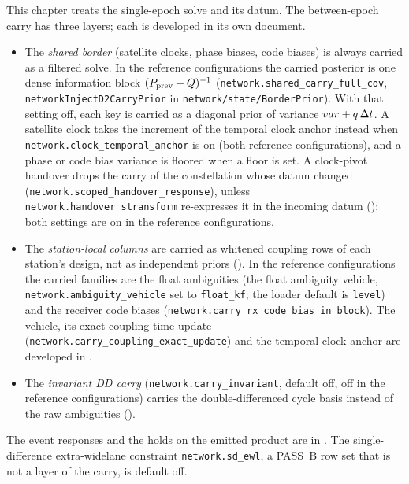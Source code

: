 \documentclass[main.tex]{subfiles}
\begin{document}
This chapter treats the single-epoch solve and its datum. The
between-epoch carry has three layers; each is developed in its own
document.
\begin{itemize}[leftmargin=*, itemsep=1pt]
\item The \emph{shared border} (satellite clocks, phase biases, code
      biases) is always carried as a filtered solve. In the reference
      configurations the carried posterior is one dense information block
      $(P_{\text{prev}} + Q)^{-1}$
      (\texttt{network.shared\_carry\_full\_cov},
      \texttt{networkInjectD2CarryPrior} in
      \texttt{network/state/BorderPrior}). With that setting off, each key
      is carried as a diagonal prior of variance $var + q\,\Delta t$.
      A satellite clock takes the increment of the temporal clock anchor
      instead when \texttt{network.clock\_temporal\_anchor} is on (both
      reference configurations), and a phase or code bias variance is
      floored when a floor is set. A clock-pivot handover drops the
      carry of the constellation whose datum changed
      (\texttt{network.scoped\_handover\_response}), unless
      \texttt{network.handover\_stransform} re-expresses it in the
      incoming datum (); both settings are on in the
      reference configurations.
\item The \emph{station-local columns} are carried as whitened coupling
      rows of each station's design, not as independent priors
      (). In the
      reference configurations the carried families are the float
      ambiguities (the float ambiguity vehicle,
      \texttt{network.ambiguity\_vehicle} set to \texttt{float\_kf};
      the loader default is \texttt{level}) and the receiver code biases
      (\texttt{network.carry\_rx\_code\_bias\_in\_block}). The vehicle,
      its exact coupling time update
      (\texttt{network.carry\_coupling\_exact\_update}) and the temporal
      clock anchor are developed in
      .
\item The \emph{invariant DD carry} (\texttt{network.carry\_invariant},
      default off, off in the reference configurations) carries the
      double-differenced cycle basis instead of the raw ambiguities
      ().
\end{itemize}
The event responses and the holds on the emitted product are in
.
The single-difference extra-widelane constraint
\texttt{network.sd\_ewl}, a PASS~B row set that is not a layer of the
carry, is default off.
\end{document}
